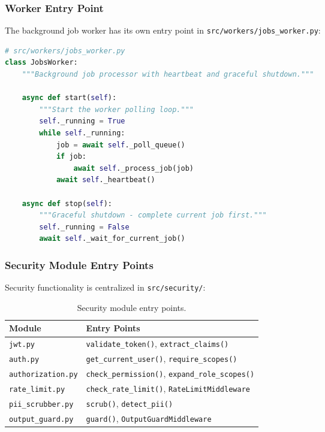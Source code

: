 \subsubsection{Worker Entry Point}

The background job worker has its own entry point in \texttt{src/workers/jobs\_worker.py}:

\begin{lstlisting}[language=Python, caption={Worker process entry point.}]
# src/workers/jobs_worker.py
class JobsWorker:
    """Background job processor with heartbeat and graceful shutdown."""
    
    async def start(self):
        """Start the worker polling loop."""
        self._running = True
        while self._running:
            job = await self._poll_queue()
            if job:
                await self._process_job(job)
            await self._heartbeat()
    
    async def stop(self):
        """Graceful shutdown - complete current job first."""
        self._running = False
        await self._wait_for_current_job()
\end{lstlisting}

\subsubsection{Security Module Entry Points}

Security functionality is centralized in \texttt{src/security/}:

\begin{table}[ht]
\centering
\caption{Security module entry points.}
\label{tab:security-modules}
\small
\begin{tabular}{ll}
\hline
\textbf{Module} & \textbf{Entry Points} \\
\hline
\texttt{jwt.py} & \texttt{validate\_token()}, \texttt{extract\_claims()} \\
\texttt{auth.py} & \texttt{get\_current\_user()}, \texttt{require\_scopes()} \\
\texttt{authorization.py} & \texttt{check\_permission()}, \texttt{expand\_role\_scopes()} \\
\texttt{rate\_limit.py} & \texttt{check\_rate\_limit()}, \texttt{RateLimitMiddleware} \\
\texttt{pii\_scrubber.py} & \texttt{scrub()}, \texttt{detect\_pii()} \\
\texttt{output\_guard.py} & \texttt{guard()}, \texttt{OutputGuardMiddleware} \\
\hline
\end{tabular}
\end{table}

